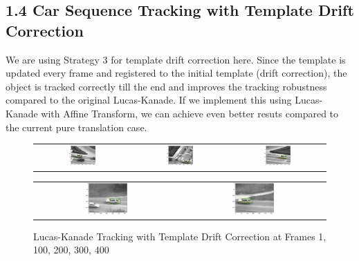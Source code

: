 \documentclass[a4paper]{article}
\begin{document}
\subsection*{1.4 \hspace{4.5} Car Sequence Tracking with Template Drift Correction}
We are using Strategy 3 for template drift correction here. Since the template is updated every frame and registered to the initial template (drift correction), the object is tracked correctly till the end and improves the tracking robustness compared to the original Lucas-Kanade. If we implement this using Lucas-Kanade with Affine Transform, we can achieve even better resuts compared to the current pure translation case.

\newpage
\begin{figure}[!ht]
\centering
\begin{tabular}{ccc}
{\includegraphics[width=0.3\textwidth]{images/carseqrects-wcrt_1}} &
{\includegraphics[width=0.3\textwidth]{images/carseqrects-wcrt_100}} &
{\includegraphics[width=0.3\textwidth]{images/carseqrects-wcrt_200}}
\end{tabular}
\begin{tabular}{cc}
{\includegraphics[width=0.3\textwidth]{images/carseqrects-wcrt_300}} &
{\includegraphics[width=0.3\textwidth]{images/carseqrects-wcrt_400}}
\end{tabular}
\caption{Lucas-Kanade Tracking with Template Drift Correction at Frames 1, 100, 200, 300, 400}
\end{figure}
\end{document}
